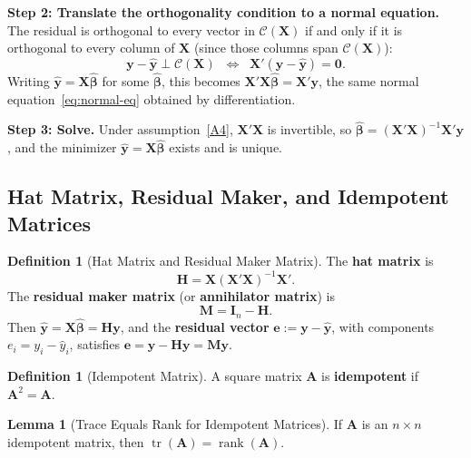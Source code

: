 \documentclass[12pt,a4paper]{article}
\makeatletter
\theoremstyle{definition}
\newtheorem{definition}[theorem]{Definition}
\newtheorem{lemma}[theorem]{Lemma}
\renewenvironment{proof}[1][\proofname]{\par
  \pushQED{\qed}%
  \normalfont \topsep6\p@\@plus6\p@\relax
  \trivlist
  \item[\hskip\labelsep\bfseries #1\@addpunct{.}]\ignorespaces
}{%
  \popQED\endtrivlist\@endpefalse
}
\DeclareMathOperator\tr{tr}
\DeclareMathOperator\rank{rank}
\newcommand{\ifff}{\;\Longleftrightarrow\;}
\newcommand{\bX}{\mathbf{X}}
\newcommand{\by}{\mathbf{y}}
\def\bb{\boldsymbol{\beta}}
\newcommand{\bI}{\mathbf{I}}
\newcommand{\bH}{\mathbf{H}}
\newcommand{\bM}{\mathbf{M}}
\newcommand{\bzero}{\mathbf{0}}
\newcommand{\bA}{\mathbf{A}}
\newcommand{\calC}{\mathcal{C}}
\makeatother
\begin{document}
\begin{proof}
\textbf{Step 2: Translate the orthogonality condition to a normal equation.} The residual is orthogonal to every vector in $\calC(\bX)$ if and only if it is orthogonal to every column of $\bX$ (since those columns span $\calC(\bX)$):
\[
\by - \hat{\by} \perp \calC(\bX) \;\ifff\; \bX'(\by - \hat{\by}) = \bzero.
\]
Writing $\hat{\by} = \bX\hat{\bb}$ for some $\hat{\bb}$, this becomes $\bX'\bX\hat{\bb} = \bX'\by$, the same normal equation~\eqref{eq:normal-eq} obtained by differentiation.

\textbf{Step 3: Solve.} Under assumption~\ref{A4}, $\bX'\bX$ is invertible, so $\hat{\bb} = (\bX'\bX)^{-1}\bX'\by$, and the minimizer $\hat{\by} = \bX\hat{\bb}$ exists and is unique.
\end{proof}

\subsection{Hat Matrix, Residual Maker, and Idempotent Matrices}

\begin{definition}[Hat Matrix and Residual Maker Matrix]\label{def:hat-matrix}
The \textbf{hat matrix} is
\begin{equation}
\bH = \bX(\bX'\bX)^{-1}\bX'.
\end{equation}
The \textbf{residual maker matrix} (or \textbf{annihilator matrix}) is
\begin{equation}
\bM = \bI_n - \bH.
\end{equation}
Then $\hat{\by} = \bX\hat{\bb} = \bH\by$, and the \textbf{residual vector} $\mathbf{e} := \by - \hat{\by}$, with components $e_i = y_i - \hat{y}_i$, satisfies $\mathbf{e} = \by - \bH\by = \bM\by$.
\end{definition}

\begin{definition}[Idempotent Matrix]\label{def:idempotent}
A square matrix $\bA$ is \textbf{idempotent} if $\bA^2 = \bA$.
\end{definition}

\begin{lemma}[Trace Equals Rank for Idempotent Matrices]\label{lem:idempotent}
If $\bA$ is an $n \times n$ idempotent matrix, then $\tr(\bA) = \rank(\bA)$.
\end{lemma}
\end{document}
